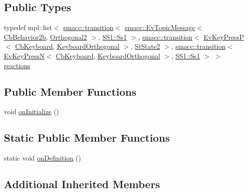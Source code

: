 \subsection*{Public Types}
\begin{DoxyCompactItemize}
\item 
typedef mpl\+::list$<$ \hyperlink{classsmacc_1_1transition}{smacc\+::transition}$<$ \hyperlink{structsmacc_1_1EvTopicMessage}{smacc\+::\+Ev\+Topic\+Message}$<$ \hyperlink{classsm__three__some_1_1CbBehavior2b}{Cb\+Behavior2b}, \hyperlink{classsm__three__some_1_1Orthogonal2}{Orthogonal2} $>$, \hyperlink{structsm__three__some_1_1SS1_1_1Ss1}{S\+S1\+::\+Ss1} $>$, \hyperlink{classsmacc_1_1transition}{smacc\+::transition}$<$ \hyperlink{structsm__three__some_1_1EvKeyPressP}{Ev\+Key\+PressP}$<$ \hyperlink{classsm__three__some_1_1CbKeyboard}{Cb\+Keyboard}, \hyperlink{classsm__three__some_1_1KeyboardOrthogonal}{Keyboard\+Orthogonal} $>$, \hyperlink{structsm__three__some_1_1StState2}{St\+State2} $>$, \hyperlink{classsmacc_1_1transition}{smacc\+::transition}$<$ \hyperlink{structsm__three__some_1_1EvKeyPressN}{Ev\+Key\+PressN}$<$ \hyperlink{classsm__three__some_1_1CbKeyboard}{Cb\+Keyboard}, \hyperlink{classsm__three__some_1_1KeyboardOrthogonal}{Keyboard\+Orthogonal} $>$, \hyperlink{structsm__three__some_1_1SS1_1_1Ss1}{S\+S1\+::\+Ss1} $>$ $>$ \hyperlink{structsm__three__some_1_1StState3_a4f3a01a6a500e60664bfc5e6252ecc34}{reactions}
\end{DoxyCompactItemize}
\subsection*{Public Member Functions}
\begin{DoxyCompactItemize}
\item 
void \hyperlink{structsm__three__some_1_1StState3_a1828977fe52a7d68ba2368517927b1d9}{on\+Initialize} ()
\end{DoxyCompactItemize}
\subsection*{Static Public Member Functions}
\begin{DoxyCompactItemize}
\item 
static void \hyperlink{structsm__three__some_1_1StState3_abed2f14f5f5e3f039797d520442cb389}{on\+Definition} ()
\end{DoxyCompactItemize}
\subsection*{Additional Inherited Members}


